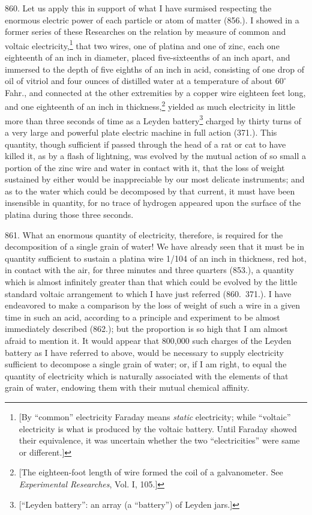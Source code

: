 860. Let us apply this in support of what I have surmised respecting the
enormous electric power of each particle or atom of matter (856.). I
showed in a former series of these Researches on the relation by measure
of common and voltaic electricity,\footnote{{[}By ``common'' electricity
  Faraday means \emph{static} electricity; while ``voltaic'' electricity
  is what is produced by the voltaic battery. Until Faraday showed their
  equivalence, it was uncertain whether the two ``electricities'' were
  same or different.{]}} that two wires, one of platina and one of zinc,
each one eighteenth of an inch in diameter, placed five-sixteenths of an
inch apart, and immersed to the depth of five eighths of an inch in
acid, consisting of one drop of oil of vitriol and four ounces of
distilled water at a temperature of about $60^{\circ}$ Fahr., and connected at
the other extremities by a copper wire eighteen feet long, and one
eighteenth of an inch in thickness,\footnote{{[}The eighteen-foot length
  of wire formed the coil of a galvanometer. See \emph{Experimental
  Researches}, Vol. I, 105.{]}} yielded as much electricity in little
more than three seconds of time as a Leyden battery\footnote{{[}``Leyden
  battery'': an array (a ``battery'') of Leyden jars.{]}} charged by
thirty turns of a very large and powerful plate electric machine in full
action (371.). This quantity, though sufficient if passed through the
head of a rat or cat to have killed it, as by a flash of lightning, was
evolved by the mutual action of so small a portion of the zinc wire and
water in contact with it, that the loss of weight sustained by either
would be inappreciable by our most delicate instruments; and as to the
water which could be de\-com\-posed by that current, it must have been
insensible in quantity, for no trace of hydrogen appeared upon the
surface of the platina during those three seconds.

861. What an enormous quantity of electricity, therefore, is required
for the de\-com\-po\-si\-tion of a single grain of water! We have already seen
that it must be in quantity sufficient to sustain a platina wire 1/104
of an inch in thickness, red hot, in contact with the air, for three
minutes and three quarters (853.), a quantity which is almost infinitely
greater than that which could be evolved by the little standard voltaic
arrangement to which I have just referred (860.\ 371.). I have endeavored
to make a comparison by the loss of weight of such a wire in a given
time in such an acid, according to a principle and experiment to be
almost immediately described (862.); but the proportion is so high that
I am almost afraid to mention it. It would appear that 800,000 such
charges of the Leyden battery as I have referred to above, would be
necessary to supply electricity sufficient to decompose a single grain
of water; or, if I am right, to equal the quantity of electricity which
is naturally associated with the elements of that grain of water,
endowing them with their mutual chemical affinity.

